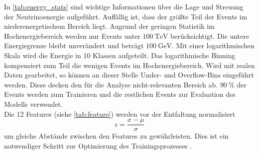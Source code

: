 In \autoref{tab:energy_stats} sind wichtige Informationen über die Lage und Streuung der Neutrinoenergie aufgeführt.
Auffällig ist, dass der größte Teil der Events im niederenergetischem Bereich liegt.
Augrund der geringen Statistik im Hochenergiebereich werden nur Events unter $\SI{100}{\tera\eV}$ berücksichtigt.
Die untere Energiegrenze bleibt unverändert und beträgt $\SI{100}{\giga\eV}$.
Mit einer logarithmischen Skala wird die Energie in 10 Klassen aufgeteilt.
Das logarithmische Binning kompensiert zum Teil die wenigen Events im Hochenergiebereich.
Wird mit realen Daten gearbeitet, so können an dieser Stelle Under- und Overflow-Bins eingeführt werden.
Diese decken den für die Analyse nicht-relevanten Bereich ab.
$\SI{90}{\percent}$ der Events werden zum Trainieren und die restlichen Events zur Evaluation des Modells verwendet.
\\
Die 12 Features (siehe \autoref{tab:feature}) werden vor der Entfaltung normalisiert
\begin{equation*}
    z = \frac{x-\mu}{\sigma}
\end{equation*}
um gleiche Abstände zwischen den Features zu gewährleisten.
Dies ist ein notwendiger Schritt zur Optimierung des Trainingsprozesses \cite{scaler}.

